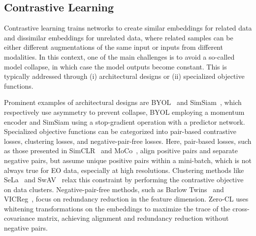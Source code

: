 \subsection{Contrastive Learning}
Contrastive learning trains networks to create similar embeddings for related data and dissimilar embeddings for unrelated data, where related samples can be either different augmentations of the same input or inputs from different modalities. In this context, one of the main challenges is to avoid a so-called model collapse, in which case the model outputs become constant. 
This is typically addressed through (i) architectural designs or (ii) specialized objective functions. 

Prominent examples of architectural designs are BYOL~\cite{Grill_etal_2020} and SimSiam~\cite{Chen_etal_2021}, which respectively use asymmetry to prevent collapse, BYOL employing a momentum encoder and SimSiam using a stop-gradient operation with a predictor network. 
Specialized objective functions can be categorized into pair-based contrastive losses, clustering losses, and negative-pair-free losses. Here, pair-based losses, such as those presented in SimCLR~\cite{Chen_etal_2020} and MoCo~\cite{He_etal_2020}, align positive pairs and separate negative pairs, but assume unique positive pairs within a mini-batch, which is not always true for EO data, especially at high resolutions. Clustering methods like SeLa~\cite{Asano_etal_2019} and SwAV~\cite{Caron_etal_2020} relax this constraint by performing the contrastive objective on data clusters. Negative-pair-free methods, such as Barlow Twins~\cite{Zbontar_etal_2021} and VICReg~\cite{bardes2021vicreg}, focus on redundancy reduction in the feature dimension. Zero-CL \cite{Zhang_etal_2021} uses whitening transformations on the embeddings to maximize the trace of the cross-covariance matrix, achieving alignment and redundancy reduction without negative pairs.

